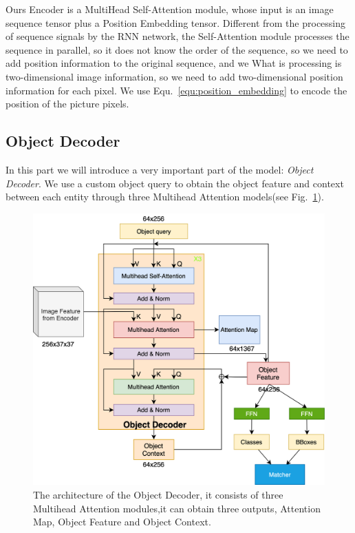 Ours Encoder is a MultiHead Self-Attention module, whose input is an image sequence tensor plus a  Position Embedding tensor. Different from the processing of sequence signals by the RNN network, the Self-Attention module processes the sequence in parallel, so it does not know the order of the sequence, so we need to add position information to the original sequence, and we What is processing is two-dimensional image information, so we need to add two-dimensional position information for each pixel. We use Equ.~\ref{equ:position_embedding} to encode the position of the picture pixels.


\subsection{Object Decoder }

In this part we will introduce a very important part of the model: \textit{Object Decoder}. We use a custom object query to obtain the object feature and context between each entity through three Multihead Attention models(see Fig.~\ref{fig:objectdecoder}).

\begin{figure}[tbph!]
	\centering
	\includegraphics[width=0.9\linewidth]{figures/object_decoder}
	\caption[Illustration of the Object Decoder]{The architecture of the Object Decoder, it consists of three Multihead Attention modules,it can obtain three outputs, Attention Map, Object Feature and Object Context.}
	\label{fig:objectdecoder}
\end{figure}

